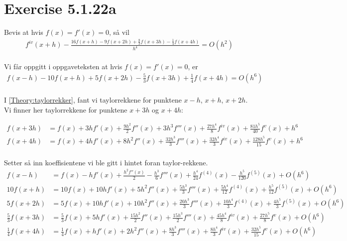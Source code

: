  
\section*{Exercise 5.1.22a}
\label{sec:oppgave22a}

Bevis at hvis $f(x) = f'(x) = 0$, så vil 
\begin{multline}
{f^{iv}}(x + h) - \frac{{16f(x + h) - 9f(x + 2h) + \frac{8}{3}f(x + 3h) - \frac{1}{4}f(x + 4h)}}{{{h^4}}} = O({h^2})  
\label{eq22a:oppg} \\
\end{multline}

Vi får oppgitt i oppgaveteksten at hvis $f(x) = f'(x) = 0$, er
\begin{align}
f(x-h)-10f(x+h)+5f(x+2h)-\frac{5}{3}f(x+3h)+\frac{1}{4}f(x+4h)=O(h^6) 
\label{eq22a:hint} \\ \nonumber
\end{align}

I \ref{Theory:taylorrekker}, fant vi taylorrekkene for punktene $x-h$, $x+h$, $x+2h$. Vi finner her taylorrekkene for punktene $x+3h$ og $x+4h$: 

\begin{align}
f(x+3h) &= f(x) + 3hf'(x) + \frac{{9{h^2}}}{2}f''(x) + 3{h^3}f'''(x) + \frac{{27{h^4}}}{8}{f^{iv}}(x) + \frac{{81{h^5}}}{40}{f^v}(x) + {h^6} \nonumber \\ 
f(x+4h) &= f(x) + 4hf'(x) + 8{h^2}f''(x) + \frac{{32{h^3}}}{3}f'''(x) + \frac{{32{h^4}}}{3}{f^{iv}}(x) + \frac{{128{h^5}}}{{15}}{f^v}(x) + {h^6}\nonumber \\ \nonumber
\end{align}


Setter så inn koeffisientene vi ble gitt i hintet foran taylor-rekkene. 
\begin{align}
 f(x-h)&=f(x)-hf'(x)+\frac{h^2f''(x)}{2}-\frac{h^3}{6}f'''(x)+\frac{h^4}{24}f^{(4)}(x)-\frac{h^5}{120}f^{(5)}(x)+O(h^6)\nonumber \\
10f(x + h) &= 10f(x) + 10hf'(x) + 5{h^2}f''(x) + \frac{{5{h^3}}}{3}f'''(x) + \frac{{5{h^4}}}{{12}}{f^{(4)}}(x) + \frac{{{h^5}}}{{12}}{f^{(5)}}(x) + O(h^6) \nonumber\\
5f(x + 2h) &= 5f(x) + 10hf'(x) + 10{h^2}f''(x) + \frac{{20{h^3}}}{3}f'''(x) + \frac{{10{h^4}}}{3}{f^{(4)}}(x) + \frac{{4{h^5}}}{3}{f^{(5)}}(x) + O(h^6) \nonumber \\
\frac{5}{3}f(x + 3h) &= \frac{5}{3}f(x) + 5hf'(x) + \frac{{15{h^2}}}{2}f''(x) + \frac{15h^3}{2}f'''(x) + \frac{{45{h^4}}}{8}{f^{iv}}(x) + \frac{{27{h^5}}}{8}{f^v}(x) + O(h^6) \nonumber \\ 
\frac{1}{4}f(x + 4h) &= \frac{1}{4}f(x) + hf'(x) + 2{h^2}f''(x) + \frac{{8{h^3}}}{3}f'''(x) + \frac{{8{h^4}}}{3}{f^{iv}}(x) + \frac{{32{h^5}}}{{15}}{f^v}(x) + O(h^6) \nonumber 
\end{align}
\newpage


